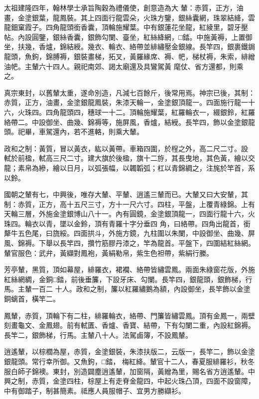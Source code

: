 \begin{pinyinscope}
 太祖建隆四年，翰林學士承旨陶穀為禮儀使，創意造為大
 輦：赤質，正方，油畫，金塗銀葉，龍鳳裝。其上四面行龍雲朵，火珠方鑒，銀絲囊網，珠翠結絳，雲龍鈿窠霞子。四角龍頭銜香囊，頂輪施耀葉。中有銀蓮花坐龍，紅綾里，碧牙壓帖。內設圓鑒，銀絲香囊，銀飾勾闌、臺坐，紅絲絳網，□錔。中施黃褥，上置御坐，扶幾，香爐，錦結綬。幾衣、輪衣、絡帶並緋繡壓金銀線。長竿四，銀裹鐵鋦龍頭，魚鉤，錦膊褥，銀裝畫梯，拓叉，黃羅緣席、褥、帊，梯杖褥，朱索，緋繒油帊。主輦六十四人。親祀南郊、謁太廟還及具鸞駕黃
 麾仗、省方還都，則乘之。



 真宗東封，以舊輦太重，遂命別造，凡減七百餘斤，後常用焉。神宗已後，其制：赤質，正方，油畫，金塗銀龍鳳裝，朱漆天輪一，金塗銀頂龍一。四面施行龍一十六，火珠四。四角龍頭四，穗球一十二。頂輪施耀葉，紅羅輪衣一，綴銀鈴，紅羅絡帶二。中設御坐、曲幾、錦褥等，施屏風，香爐，結綬。長竿四，飾以金塗銀龍頭。祀畢，車駕還內，若不進輅，則乘大輦。



 政和之制：黃質，冒以黃衣，紘以黃帶。車箱四圍，於桯之外，高二尺二寸。設
 軾於前楹，軾高三尺二寸。建大旗於後楹，旗十二斿，其長曳地，其色黃，繪以交龍；素帛為縿，繪以日月，以弧張幅，以韣韜弧；杠以青錦綢之，注旄於竿首，系以鈴。



 國朝之輦有七，中興後，唯存大輦、平輦、逍遙三輦而已。大輦又曰大安輦，其制：赤質，正方，高十五尺三寸，方十一尺六寸。四柱，平盤，上覆青綠錦。上有天輪三層，外施金塗銀博山八十一。內有圓鏡，金塗銀頂龍一，四面行龍十六，火珠四。輪衣以青，墜以金鈴，頂有青羅十字分垂四
 角，曰絡帶。四角出龍首，銜犛牛五色尾，曰旒綏。四面拱斗，外施方鏡，九柱圍以朱闌，中設御坐、曲幾、屏風、錦褥。下舉以長竿四，攢竹筋膠丹漆之，竿為龍首。平盤下，四圍結紅絲網。輦官服色：武弁，黃纈對鳳袍，黃絹勒帛，紫生色袒帶，紫絹行縢。



 芳亭輦，黑質，頂如幕屋，緋羅衣，裙襴、絡帶皆繡雲鳳。兩面朱綠窗花版，外施紅絲網綢，金銅□錔，前後垂簾，下設牙床、勾闌。長竿四，銀龍頭，銀飾梯，行馬。主輦一百二
 十人。政和之制，簾以紅羅繡鵝為額，內設御坐，長竿飾以金塗銅螭首，橫竿二。



 鳳輦，赤質，頂輪下有二柱，緋羅輪衣，絡帶、門簾皆繡雲鳳。頂有金鳳一，兩壁刻畫龜文、金鳳翅。前有軾匱、香爐、香寶、結帶，下有勾闌二重，內設紅錦褥。長竿二，銀飾梯，行馬。主輦八十人。法駕鹵簿，不設鳳輦。



 逍遙輦，以棕櫚為屋，赤質，金塗銀裝，朱漆扶版二，云版一，長竿二，飾以金塗銀龍頭。常行幸所御。又魚鉤，□錔，
 梅紅絳。輦官十二人，春夏服緋羅衫，秋冬服白師子錦襖。東封，別造闢塵逍遙輦，加窗隔，黃繒為里，賜名省方逍遙輦。中興之制，赤質，金塗四柱，棕屋上有走脊金龍四，中起火珠凸頂，四面不設窗障，中有御踏子，制甚簡素。祗應人員服帽子、宜男方勝纈衫。




\end{pinyinscope}
